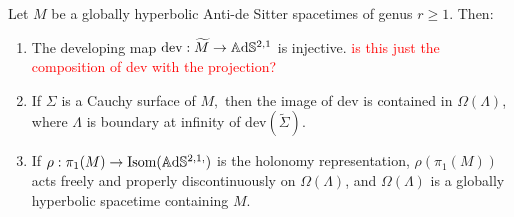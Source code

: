 \begin{proposition}\label{holorep}
    Let $M$ be a globally hyperbolic Anti-de Sitter spacetimes of genus $r\geq 1$. Then: 
    \begin{enumerate}
        \item The developing map $\text{dev}:\widetilde{M}  \to  \mathbb{A}\mathrm{d}\mathbb{S}^{2,1}$ is injective. \textcolor{red}{is this just the composition of dev with the projection?}
        \item If $\Sigma$ is a Cauchy surface of $M,$ then the image of dev is contained in $\Omega(\Lambda)$, where $\Lambda$ is boundary at infinity of $\text{dev}(\widetilde{\Sigma}).$
        \item If $\rho:\pi_1(M)\to\text{Isom}(\mathbb{A}\mathrm{d}\mathbb{S}^{2,1,})$ is the holonomy representation, $\rho(\pi_1(M))$ acts freely and properly discontinuously on $\Omega(\Lambda)$, and $\Omega(\Lambda)$ is a globally hyperbolic spacetime containing $M$. 
    \end{enumerate}
\end{proposition}
